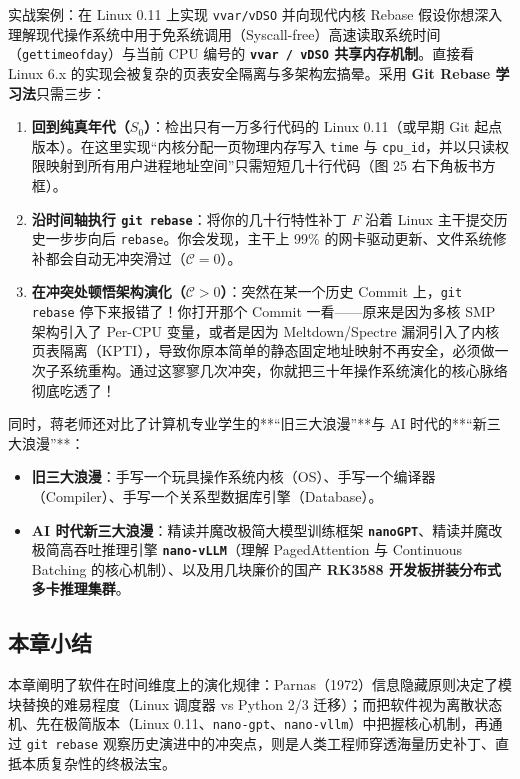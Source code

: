 \documentclass[a4paper]{article}
\begin{document}
\begin{knowledgebox}{实战案例：在 Linux 0.11 上实现 \texttt{vvar/vDSO} 并向现代内核 Rebase}
假设你想深入理解现代操作系统中用于免系统调用（Syscall-free）高速读取系统时间（\texttt{gettimeofday}）与当前 CPU 编号的 \textbf{\texttt{vvar / vDSO} 共享内存机制}。直接看 Linux 6.x 的实现会被复杂的页表安全隔离与多架构宏搞晕。采用 \textbf{Git Rebase 学习法}只需三步：
\begin{enumerate}
    \item \textbf{回到纯真年代（$S_0$）}：检出只有一万多行代码的 Linux 0.11（或早期 Git 起点版本）。在这里实现“内核分配一页物理内存写入 \texttt{time} 与 \texttt{cpu\_id}，并以只读权限映射到所有用户进程地址空间”只需短短几十行代码（图 25 右下角板书方框）。
    \item \textbf{沿时间轴执行 \texttt{git rebase}}：将你的几十行特性补丁 $F$ 沿着 Linux 主干提交历史一步步向后 \texttt{rebase}。你会发现，主干上 99\% 的网卡驱动更新、文件系统修补都会自动无冲突滑过（$\mathcal{C} = 0$）。
    \item \textbf{在冲突处顿悟架构演化（$\mathcal{C} > 0$）}：突然在某一个历史 Commit 上，\texttt{git rebase} 停下来报错了！你打开那个 Commit 一看——原来是因为多核 SMP 架构引入了 Per-CPU 变量，或者是因为 Meltdown/Spectre 漏洞引入了内核页表隔离（KPTI），导致你原本简单的静态固定地址映射不再安全，必须做一次子系统重构。通过这寥寥几次冲突，你就把三十年操作系统演化的核心脉络彻底吃透了！
\end{enumerate}
\end{knowledgebox}

同时，蒋老师还对比了计算机专业学生的**“旧三大浪漫”**与 AI 时代的**“新三大浪漫”**：
\begin{itemize}
    \item \textbf{旧三大浪漫}：手写一个玩具操作系统内核（OS）、手写一个编译器（Compiler）、手写一个关系型数据库引擎（Database）。
    \item \textbf{AI 时代新三大浪漫}：精读并魔改极简大模型训练框架 \textbf{\texttt{nanoGPT}}、精读并魔改极简高吞吐推理引擎 \textbf{\texttt{nano-vLLM}}（理解 PagedAttention 与 Continuous Batching 的核心机制）、以及用几块廉价的国产 \textbf{RK3588 开发板拼装分布式多卡推理集群}。
\end{itemize}

\subsection{本章小结}

本章阐明了软件在时间维度上的演化规律：Parnas（1972）信息隐藏原则决定了模块替换的难易程度（Linux 调度器 vs Python 2/3 迁移）；而把软件视为离散状态机、先在极简版本（Linux 0.11、\texttt{nano-gpt}、\texttt{nano-vllm}）中把握核心机制，再通过 \texttt{git rebase} 观察历史演进中的冲突点，则是人类工程师穿透海量历史补丁、直抵本质复杂性的终极法宝。
\end{document}
